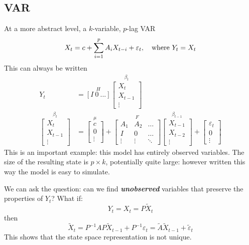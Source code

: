 \documentclass[
  letterpaper,
]{book}
\begin{document}
\hypertarget{var}{%
\subsection{VAR}\label{var}}

At a more abstract level, a \(k\)-variable, \(p\)-lag VAR \[
  X_t = c + \sum_{i=1}^p A_i X_{t-i} + \varepsilon_t,\quad\hbox{where}\ Y_t = X_t
\] This can always be written \[
    \begin{align*}
    Y_t &= 
    \overset{H}{\left[ I \ 0 \  ...\right] } 
    \overset{\beta_t}{\left[ \begin{array}{c}X_t \\ X_{t-1} \\ \vdots\end{array}\right] } \\
    \overset{\beta_t}{\left[ \begin{array}{c} X_t  \\ X_{t-1} \\ \vdots \end{array}\right] } &=
    \overset{\mu}{\left[  \begin{array}{c}c \\ 0 \\ \vdots\end{array} \right] }+
    \overset{F}{\left[ \begin{array}{ccc}
    A_1 & A_2 & \ldots \\  I & 0 & \ldots \\ \vdots & \vdots & \ddots \end{array} \right] }
    \overset{\beta_{t-1}}{\left[ \begin{array}{c}X_{t-1} \\ X_{t-2} \\ \vdots\end{array}\right] } + 
    \left[ \begin{array}{c} \varepsilon_t \\ 0 \\ \vdots\end{array}
    \right]
    \end{align*}
\] This is an important example: this model has entirely observed
variables. The size of the resulting state is \(p\times k\), potentially
quite large: however written this way the model is easy to simulate.

We can ask the question: can we find \textbf{\emph{unobserved}}
variables that preserve the properties of \(Y_t\)? What if: \[
     Y_t = X_t = P \tilde X_t
\] then \[
    \tilde X_t = P^{-1}A P \tilde X_{t-1} + P^{-1} \varepsilon_t = \tilde A \tilde X_{t-1} + \tilde \varepsilon_t
\] This shows that the state space representation is not unique.
\end{document}
